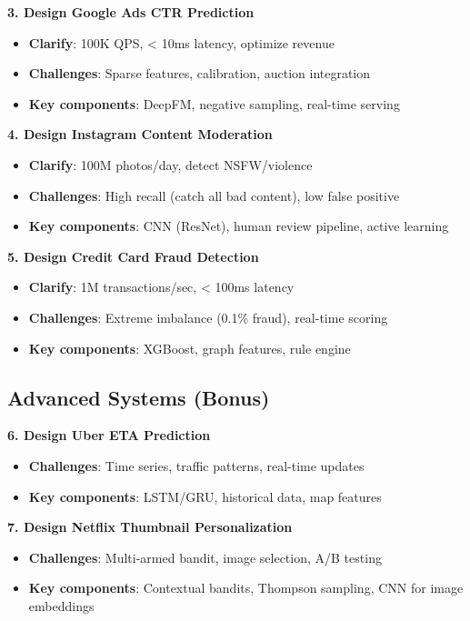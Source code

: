 \documentclass[10pt]{article}
\begin{document}
\textbf{3. Design Google Ads CTR Prediction}
\begin{itemize}
\item \textbf{Clarify}: 100K QPS, < 10ms latency, optimize revenue
\item \textbf{Challenges}: Sparse features, calibration, auction integration
\item \textbf{Key components}: DeepFM, negative sampling, real-time serving
\end{itemize}

\textbf{4. Design Instagram Content Moderation}
\begin{itemize}
\item \textbf{Clarify}: 100M photos/day, detect NSFW/violence
\item \textbf{Challenges}: High recall (catch all bad content), low false positive
\item \textbf{Key components}: CNN (ResNet), human review pipeline, active learning
\end{itemize}

\textbf{5. Design Credit Card Fraud Detection}
\begin{itemize}
\item \textbf{Clarify}: 1M transactions/sec, < 100ms latency
\item \textbf{Challenges}: Extreme imbalance (0.1\% fraud), real-time scoring
\item \textbf{Key components}: XGBoost, graph features, rule engine
\end{itemize}

\subsection{Advanced Systems (Bonus)}

\textbf{6. Design Uber ETA Prediction}
\begin{itemize}
\item \textbf{Challenges}: Time series, traffic patterns, real-time updates
\item \textbf{Key components}: LSTM/GRU, historical data, map features
\end{itemize}

\textbf{7. Design Netflix Thumbnail Personalization}
\begin{itemize}
\item \textbf{Challenges}: Multi-armed bandit, image selection, A/B testing
\item \textbf{Key components}: Contextual bandits, Thompson sampling, CNN for image embeddings
\end{itemize}
\end{document}
